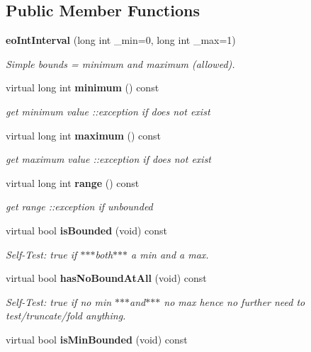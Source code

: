 \subsection*{Public Member Functions}
\begin{CompactItemize}
\item 
{\bf eo\-Int\-Interval} (long int \_\-min=0, long int \_\-max=1)\label{classeo_int_interval_a1}

\begin{CompactList}\small\item\em Simple bounds = minimum and maximum (allowed). \item\end{CompactList}\item 
virtual long int {\bf minimum} () const \label{classeo_int_interval_a2}

\begin{CompactList}\small\item\em get minimum value ::exception if does not exist \item\end{CompactList}\item 
virtual long int {\bf maximum} () const \label{classeo_int_interval_a3}

\begin{CompactList}\small\item\em get maximum value ::exception if does not exist \item\end{CompactList}\item 
virtual long int {\bf range} () const \label{classeo_int_interval_a4}

\begin{CompactList}\small\item\em get range ::exception if unbounded \item\end{CompactList}\item 
virtual bool {\bf is\-Bounded} (void) const \label{classeo_int_interval_a5}

\begin{CompactList}\small\item\em Self-Test: true if $\ast$$\ast$$\ast$both$\ast$$\ast$$\ast$ a min and a max. \item\end{CompactList}\item 
virtual bool {\bf has\-No\-Bound\-At\-All} (void) const \label{classeo_int_interval_a6}

\begin{CompactList}\small\item\em Self-Test: true if no min $\ast$$\ast$$\ast$and$\ast$$\ast$$\ast$ no max hence no further need to test/truncate/fold anything. \item\end{CompactList}\item 
virtual bool {\bf is\-Min\-Bounded} (void) const \label{classeo_int_interval_a7}


\end{CompactItemize}
